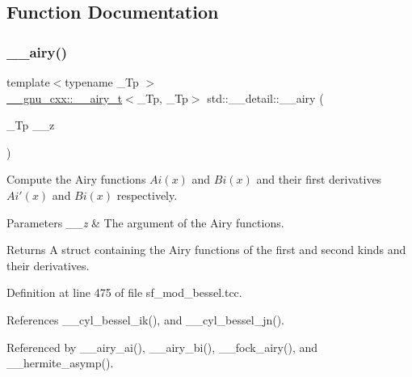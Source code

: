 \subsection{Function Documentation}
\mbox{\label{namespacestd_1_1____detail_ab88aba2ff9e70425c477043a9fa6a0dc}} 
\subsubsection{\texorpdfstring{\+\_\+\+\_\+airy()}{\_\_airy()}}
{\footnotesize\ttfamily template$<$typename \+\_\+\+Tp $>$ \\
\hyperlink{struct____gnu__cxx_1_1____airy__t}{\+\_\+\+\_\+gnu\+\_\+cxx\+::\+\_\+\+\_\+airy\+\_\+t}$<$\+\_\+\+Tp, \+\_\+\+Tp$>$ std\+::\+\_\+\+\_\+detail\+::\+\_\+\+\_\+airy (\begin{DoxyParamCaption}\item[{\+\_\+\+Tp}]{\+\_\+\+\_\+z }\end{DoxyParamCaption})}



Compute the Airy functions $ Ai(x) $ and $ Bi(x) $ and their first derivatives $ Ai'(x) $ and $ Bi(x) $ respectively. 


\begin{DoxyParams}{Parameters}
{\em \+\_\+\+\_\+z} & The argument of the Airy functions. \\
\hline
\end{DoxyParams}
\begin{DoxyReturn}{Returns}
A struct containing the Airy functions of the first and second kinds and their derivatives. 
\end{DoxyReturn}


Definition at line 475 of file sf\+\_\+mod\+\_\+bessel.\+tcc.



References \+\_\+\+\_\+cyl\+\_\+bessel\+\_\+ik(), and \+\_\+\+\_\+cyl\+\_\+bessel\+\_\+jn().



Referenced by \+\_\+\+\_\+airy\+\_\+ai(), \+\_\+\+\_\+airy\+\_\+bi(), \+\_\+\+\_\+fock\+\_\+airy(), and \+\_\+\+\_\+hermite\+\_\+asymp().

\mbox{\label{namespacestd_1_1____detail_afd48b5702344f832a250922ac4ffb917}} 
